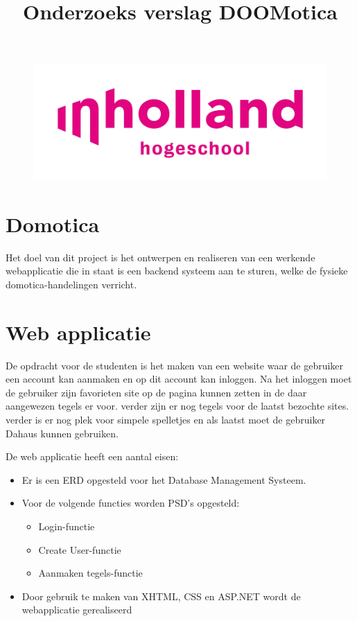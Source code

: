 \documentclass[11pt]{article}
\title{Onderzoeks verslag DOOMotica}
\begin{document}
	\maketitle %
	\begin{figure}[h]
		\centering
		\includegraphics[width=\textwidth]{inholland}
	\end{figure}
	
	\newpage
	
	\tableofcontents
	\newpage
	\section{Domotica}
	Het doel van dit project is het ontwerpen en realiseren van een werkende webapplicatie die in staat is een backend systeem aan te sturen, welke de fysieke domotica-handelingen verricht.
	\newline
	\newline
	\newline
	\newline
	\section{Web applicatie}
	
	De opdracht voor de studenten is het maken van een website waar de gebruiker een account kan aanmaken en op dit account kan inloggen. Na het inloggen moet de gebruiker zijn favorieten site op de pagina kunnen zetten in de daar aangewezen tegels er voor. verder zijn er nog tegels voor de laatst bezochte sites. verder is er nog plek voor simpele spelletjes en als laatst moet de gebruiker Dahaus kunnen gebruiken.
	
	De web applicatie heeft een aantal eisen:
	\begin{itemize}
		\item Er is een ERD opgesteld voor het Database Management Systeem.
		\item Voor de volgende functies worden PSD's opgesteld:
		\begin{itemize}
			\item Login-functie
			\item Create User-functie
			\item Aanmaken tegels-functie
		\end{itemize}
		\item Door gebruik te maken van XHTML, CSS en ASP.NET wordt de webapplicatie gerealiseerd
	\end{itemize}
	\newpage
	
\end{document}

